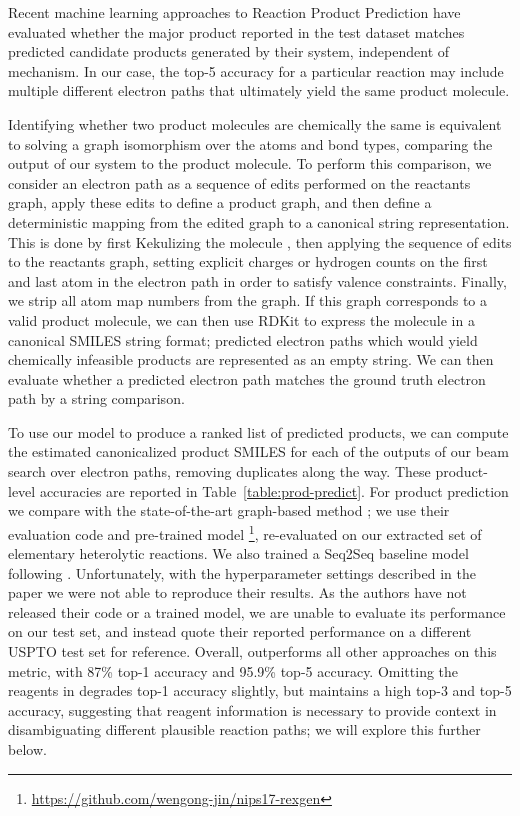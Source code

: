 Recent machine learning approaches to Reaction Product Prediction \citep{jin2017predicting,schwaller2017found}
have evaluated whether the major product reported in the test dataset matches predicted candidate products generated by their system, independent of mechanism.
In our case, the top-5 accuracy for a particular reaction may include multiple different electron paths that ultimately yield the same product molecule.

Identifying whether two product molecules are chemically the same is equivalent to solving a graph isomorphism over the atoms and bond types, comparing the output of our system to the product molecule.
To perform this comparison, we consider an electron path as a sequence of edits performed on the reactants graph, apply these edits to define a product graph, 
and then define a deterministic mapping from the edited graph to a canonical string representation.
This is done by first Kekulizing the molecule ,
then applying the sequence of edits to the reactants graph,
setting explicit charges or hydrogen counts on the first and last atom in the electron path in order to satisfy valence constraints.
Finally, we strip all atom map numbers from the graph.
If this graph corresponds to a valid product molecule, we can then use RDKit to express the molecule in a canonical SMILES string format;
predicted electron paths which would yield chemically infeasible products are represented as an empty string.
We can then evaluate whether a predicted electron path matches the ground truth electron path by a string comparison.

To use our model to produce a ranked list of predicted products, we can compute the estimated canonicalized product SMILES for each of the outputs of our beam search over electron paths, removing duplicates along the way. 
These product-level accuracies are reported in Table~\ref{table:prod-predict}.
For product prediction we compare with the state-of-the-art graph-based method \cite{jin2017predicting};
we use their evaluation code and pre-trained model \footnote{\url{https://github.com/wengong-jin/nips17-rexgen}},
re-evaluated on our extracted set of elementary heterolytic reactions.
We also trained a Seq2Seq baseline model following \cite{schwaller2017found}. 
Unfortunately, with the hyperparameter settings described in the paper we were not able to reproduce their results.
As the authors have not released their code or a trained model, we are unable to evaluate its performance on our test set, and instead quote their reported performance on a different USPTO test set for reference.
Overall, \ourModelR outperforms all other approaches on this metric, with 87\% top-1 accuracy and 95.9\% top-5 accuracy.
Omitting the reagents in \ourModelR degrades top-1 accuracy slightly, but maintains a high top-3 and top-5 accuracy,
suggesting that reagent information is necessary to provide context in disambiguating different plausible reaction paths;
we will explore this further below.



